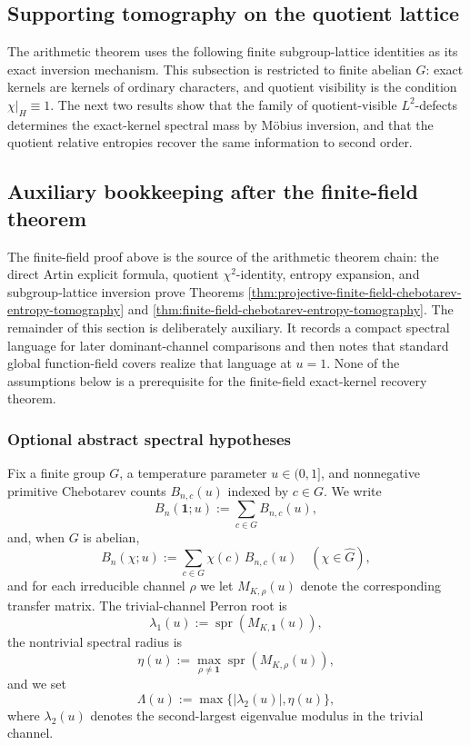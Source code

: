 \documentclass[12pt,a4paper]{article}
\theoremstyle{plain}
\theoremstyle{definition}
\numberwithin{equation}{section}
\DeclareMathOperator{\spr}{spr}
\newcommand{\ind}{\mathbf{1}}
\begin{document}


\subsection{Supporting tomography on the quotient lattice}
The arithmetic theorem uses the following finite subgroup-lattice identities as its exact inversion mechanism. This subsection is restricted to finite abelian \(G\): exact kernels are kernels of ordinary characters, and quotient visibility is the condition \(\chi|_H\equiv1\). The next two results show that the family of quotient-visible \(L^2\)-defects determines the exact-kernel spectral mass by M\"obius inversion, and that the quotient relative entropies recover the same information to second order.



\subsection{Auxiliary bookkeeping after the finite-field theorem}\label{subsec:auxiliary-bookkeeping-after-arithmetic}
The finite-field proof above is the source of the arithmetic theorem chain: the direct Artin explicit formula, quotient \(\chi^2\)-identity, entropy expansion, and subgroup-lattice inversion prove Theorems \ref{thm:projective-finite-field-chebotarev-entropy-tomography} and \ref{thm:finite-field-chebotarev-entropy-tomography}.  The remainder of this section is deliberately auxiliary.  It records a compact spectral language for later dominant-channel comparisons and then notes that standard global function-field covers realize that language at \(u=1\).  None of the assumptions below is a prerequisite for the finite-field exact-kernel recovery theorem.

\subsubsection{Optional abstract spectral hypotheses}\label{subsubsec:auxiliary-chebotarev-bookkeeping}
Fix a finite group \(G\), a temperature parameter \(u\in(0,1]\), and nonnegative primitive Chebotarev counts \(B_{n,c}(u)\) indexed by \(c\in G\). We write
\[
B_n(\ind;u):=\sum_{c\in G}B_{n,c}(u),
\]
and, when \(G\) is abelian,
\[
B_n(\chi;u):=\sum_{c\in G}\chi(c)\,B_{n,c}(u)
\quad(\chi\in \widehat G),
\]
and for each irreducible channel \(\rho\) we let \(M_{K,\rho}(u)\) denote the corresponding transfer matrix. The trivial-channel Perron root is
\[
\lambda_1(u):=\spr(M_{K,\ind}(u)),
\]
the nontrivial spectral radius is
\[
\eta(u):=\max_{\rho\neq \ind}\spr(M_{K,\rho}(u)),
\]
and we set
\[
\Lambda(u):=\max\{|\lambda_2(u)|,\eta(u)\},
\]
where \(\lambda_2(u)\) denotes the second-largest eigenvalue modulus in the trivial channel.
\end{document}
